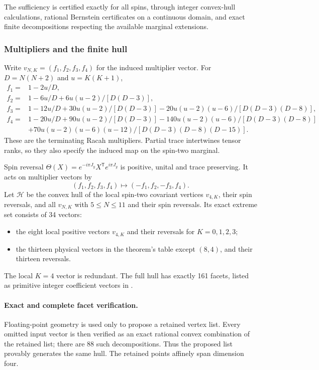 \documentclass[11pt,a4paper]{article}
\begin{document}
The sufficiency is certified exactly for all spins, through
integer convex-hull calculations, rational Bernstein certificates
on a continuous domain, and exact finite decompositions respecting
the available marginal extensions.

\subsubsection{Multipliers and the finite hull}
Write $v_{N,K}=(f_1,f_2,f_3,f_4)$ for the induced multiplier vector.
For $D=N(N+2)$ and $u=K(K+1)$,
\begin{align*}
 f_1={}&1-2u/D,\\
 f_2={}&1-6u/D+6u(u-2)/[D(D-3)],\\
 f_3={}&1-12u/D+30u(u-2)/[D(D-3)]
               -20u(u-2)(u-6)/[D(D-3)(D-8)],\\
 f_4={}&1-20u/D+90u(u-2)/[D(D-3)]
               -140u(u-2)(u-6)/[D(D-3)(D-8)]\\
       &+70u(u-2)(u-6)(u-12)/[D(D-3)(D-8)(D-15)].
\end{align*}
These are the terminating Racah multipliers.
Partial trace intertwines tensor ranks, so they also specify the
induced map on the spin-two marginal.

Spin reversal $\Theta(X)=e^{-i\pi J_y}X^{\mathsf T}e^{i\pi J_y}$
is positive, unital and trace preserving. It acts on multiplier
vectors by
\[
 (f_1,f_2,f_3,f_4)\mapsto(-f_1,f_2,-f_3,f_4).
\]
Let $\mathcal H$ be the convex hull of the local spin-two covariant
vertices $v_{4,K}$, their spin reversals, and all $v_{N,K}$ with
$5\le N\le11$ and their spin reversals.
Its exact extreme set consists of 34 vectors:
\begin{itemize}
\item the eight local positive vectors $v_{4,K}$ and their reversals
      for $K=0,1,2,3$;
\item the thirteen physical vectors in the theorem's table except
      $(8,4)$, and their thirteen reversals.
\end{itemize}
The local $K=4$ vector is redundant.
The full hull has exactly 161 facets, listed as primitive integer
coefficient vectors in .

\paragraph{Exact and complete facet verification.}
Floating-point geometry is used only to propose a retained vertex
list. Every omitted input vector is then verified as an exact
rational convex combination of the retained list; there are 88
such decompositions. Thus the proposed list provably generates the
same hull. The retained points affinely span dimension four.
\end{document}
